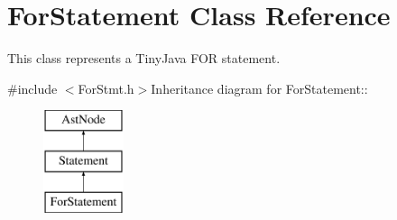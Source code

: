 \hypertarget{classForStatement}{
\section{ForStatement Class Reference}
\label{classForStatement}
}


This class represents a TinyJava FOR statement.  


{\ttfamily \#include $<$ForStmt.h$>$}Inheritance diagram for ForStatement::\begin{figure}[H]
\begin{center}
\leavevmode
\includegraphics[height=3cm]{classForStatement}
\end{center}
\end{figure}
